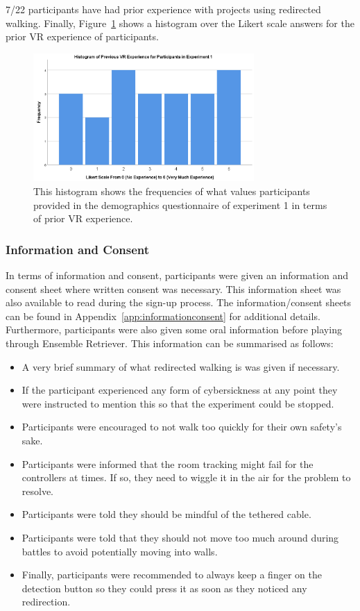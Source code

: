 7/22 participants have had prior experience with projects using redirected walking. Finally, Figure~\ref{fig:ex1PriorVRExperience} shows a histogram over the Likert scale answers for the prior VR experience of participants. 

\begin{figure}[tbph]
    \centering
    \includegraphics[width=0.75\textwidth]{figures/graphs/Experiment1VRExperienceHisto.png}
    \caption[Histogram on Prior VR Experience of Participants in Experiment 1]{This histogram shows the frequencies of what values participants provided in the demographics questionnaire of experiment 1 in terms of prior VR experience.}
    \label{fig:ex1PriorVRExperience}
\end{figure}

\subsubsection{Information and Consent}
In terms of information and consent, participants were given an information and consent sheet where written consent was necessary. This information sheet was also available to read during the sign-up process. The information/consent sheets can be found in Appendix~\ref{app:informationconsent} for additional details. Furthermore, participants were also given some oral information before playing through Ensemble Retriever. This information can be summarised as follows:

\begin{itemize}
    \item A very brief summary of what redirected walking is was given if necessary.
    \item If the participant experienced any form of cybersickness at any point they were instructed to mention this so that the experiment could be stopped.
    \item Participants were encouraged to not walk too quickly for their own safety's sake.
    \item Participants were informed that the room tracking might fail for the controllers at times. If so, they need to wiggle it in the air for the problem to resolve.
    \item Participants were told they should be mindful of the tethered cable.
    \item Participants were told that they should not move too much around during battles to avoid potentially moving into walls. 
    \item Finally, participants were recommended to always keep a finger on the detection button so they could press it as soon as they noticed any redirection.
\end{itemize}

